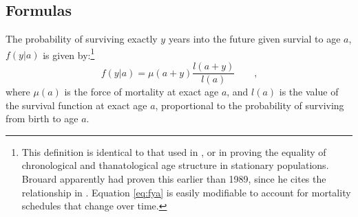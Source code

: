 \documentclass{article}
\newcommand{\tc}{\quad\quad\text{,}}
\begin{document}
\begin{appendices}
\section{Formulas}
The probability of surviving exactly $y$ years into the future given survial to
age $a$, $f(y|a)$ is given by:\footnote{This definition is identical to
that used in \citet{brouard1989mouvements}, \citet{vaupel2009life} or
\citet{rao2014generalization} in proving the equality of chronological and
thanatological age structure in stationary populations. Brouard apparently had
proven this earlier than 1989, since he cites the relationship in
\citet{brouard1986structure}. Equation \eqref{eq:fya} is easily modifiable to
account for mortality schedules that change over time.}
\begin{equation}
\label{eq:fya}
f(y|a) = \mu(a+y) \frac{l(a+y)}{l(a)} \tc
\end{equation}
where $\mu(a)$ is the force of mortality at exact age $a$, and $l(a)$ is
the value of the survival function at exact age $a$, proportional to the
probability of surviving from birth to age $a$. 



\end{appendices}
\end{document}

